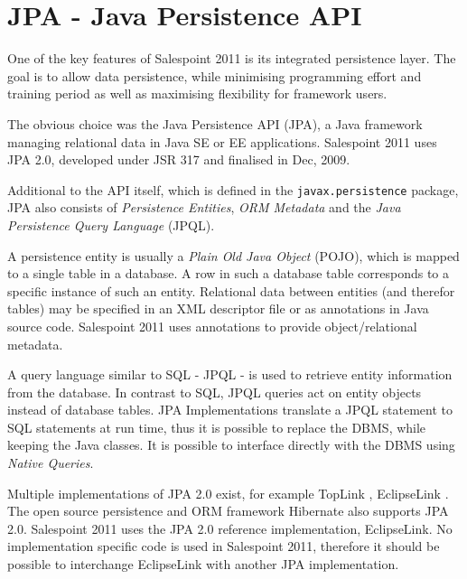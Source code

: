 \section{JPA - Java Persistence API}
One of the key features of Salespoint 2011 is its integrated persistence layer. The goal is to allow data persistence, while minimising programming effort and training period as well as maximising flexibility for framework users.

The obvious choice was the Java Persistence API (JPA), a Java framework managing relational data in Java SE or EE applications. Salespoint 2011 uses JPA 2.0, developed under JSR 317 and finalised in Dec, 2009.

Additional to the API itself, which is defined in the \texttt{javax.persistence} package, JPA also consists of \textit{Persistence Entities}, \textit{ORM Metadata} and the \textit{Java Persistence Query Language} (JPQL).

A persistence entity is usually a \textit{Plain Old Java Object} (POJO), which is mapped to a single table in a database.
A row in such a database table corresponds to a specific instance of such an entity.
Relational data between entities (and therefor tables) may be specified in an XML descriptor file or as annotations in Java source code.
Salespoint 2011 uses annotations to provide object/relational metadata.

A query language similar to SQL - JPQL - is used to retrieve entity information from the database. In contrast to SQL, JPQL queries act on entity objects instead of database tables. JPA Implementations translate a JPQL statement to SQL statements at run time, thus it is possible to replace the DBMS, while keeping the Java classes. It is possible to interface directly with the DBMS using \textit{Native Queries}.

Multiple implementations of JPA 2.0 exist, for example TopLink \cite{toplink}, EclipseLink \cite{eclipselink}. The open source persistence and ORM framework Hibernate \cite{hibernate} also supports JPA 2.0. Salespoint 2011 uses the JPA 2.0 reference implementation, EclipseLink. No implementation specific code is used in Salespoint 2011, therefore it should be possible to interchange EclipseLink with another JPA implementation.
